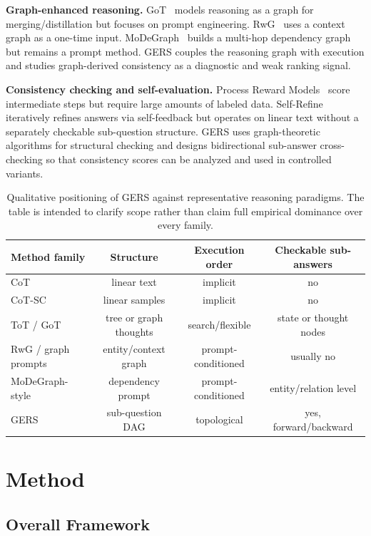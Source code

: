 \documentclass[11pt,a4paper]{article}
\begin{document}
\noindent\textbf{Graph-enhanced reasoning.} GoT~\cite{besta2024got} models reasoning as a graph for merging/distillation but focuses on prompt engineering. RwG~\cite{han2025rwg} uses a context graph as a one-time input. MoDeGraph~\cite{oruche2025modegraph} builds a multi-hop dependency graph but remains a prompt method. GERS couples the reasoning graph with execution and studies graph-derived consistency as a diagnostic and weak ranking signal.

\noindent\textbf{Consistency checking and self-evaluation.} Process Reward Models~\cite{lightman2024verify} score intermediate steps but require large amounts of labeled data. Self-Refine~\cite{madaan2023selfrefine} iteratively refines answers via self-feedback but operates on linear text without a separately checkable sub-question structure. GERS uses graph-theoretic algorithms for structural checking and designs bidirectional sub-answer cross-checking so that consistency scores can be analyzed and used in controlled variants.

\begin{table}[h]
\centering
\caption{Qualitative positioning of GERS against representative reasoning paradigms. The table is intended to clarify scope rather than claim full empirical dominance over every family.}
\small
\begin{tabular}{lccc}
\toprule
Method family & Structure & Execution order & Checkable sub-answers \\
\midrule
CoT & linear text & implicit & no \\
CoT-SC & linear samples & implicit & no \\
ToT / GoT & tree or graph thoughts & search/flexible & state or thought nodes \\
RwG / graph prompts & entity/context graph & prompt-conditioned & usually no \\
MoDeGraph-style & dependency prompt & prompt-conditioned & entity/relation level \\
GERS & sub-question DAG & topological & yes, forward/backward \\
\bottomrule
\end{tabular}
\label{tab:method_position}
\end{table}

\section{Method}

\subsection{Overall Framework}
\end{document}

